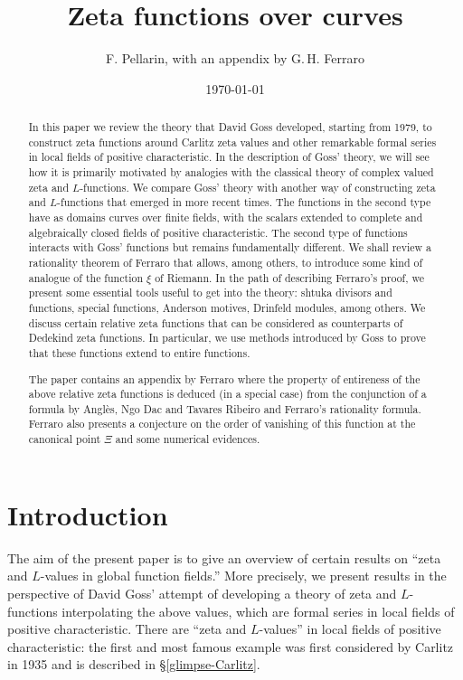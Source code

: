 \documentclass[11pt]{amsart}
\title{Zeta functions over curves}
\date{\today}
\author{F. Pellarin, with an appendix by G.\,H. Ferraro}
\numberwithin{equation}{section}
\begin{document}
\begin{abstract}
In this paper we review the theory that David Goss developed, starting from 1979, to construct zeta functions 
around Carlitz zeta values and other remarkable formal series in local fields of positive characteristic. In the description of Goss' theory, we will see how it is primarily motivated by analogies with the classical theory of complex valued zeta and $L$-functions. We compare Goss' theory with another way of constructing zeta and $L$-functions that emerged in more recent times. 
The functions in the second type have as domains curves over finite fields, with the scalars extended to complete and algebraically closed fields of positive characteristic. The second type of functions interacts with 
Goss' functions but remains fundamentally different. We shall review a rationality theorem of Ferraro that allows, among others, to introduce some kind of analogue of the function $\xi$ of Riemann. In the path of describing Ferraro's proof,
we present some essential tools useful to get into the theory: shtuka divisors and functions, special functions, Anderson motives, Drinfeld modules, among others. We discuss certain relative zeta functions that can be considered as counterparts of Dedekind zeta functions. In particular, we use methods introduced by Goss to prove that these functions extend to entire functions. 

The paper contains an appendix by Ferraro where the property of entireness of the above relative zeta functions is deduced (in a special case) from 
the conjunction of a formula by Angl\`es, Ngo Dac and Tavares Ribeiro and Ferraro's rationality formula. Ferraro also 
presents a conjecture on the order of vanishing of this function at the canonical point $\Xi$ and some numerical evidences.
\end{abstract}


\maketitle

\tableofcontents



\section{Introduction}

The aim of the present paper is to give an overview of certain results on ``zeta and $L$-values in global function fields.'' More precisely, we present results in the perspective of David Goss' attempt of developing a theory of zeta and $L$-functions interpolating the above values, which are formal series in local fields of positive characteristic. There are ``zeta and $L$-values'' in 
local fields of positive characteristic: the first and most famous example was first considered by Carlitz in 1935 and is described in \S \ref{glimpse-Carlitz}. 
\end{document}
